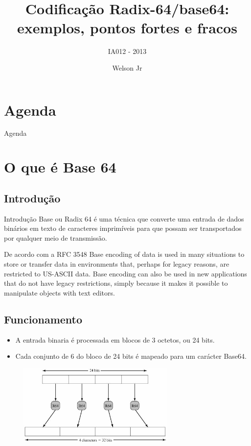\documentclass[pdf]{beamer}
\author{Welson Jr}
\title{Codificação Radix-64/base64: exemplos, pontos fortes e fracos}
\subtitle{IA012 - 2013}
\begin{document}
\begin{frame}
\transdissolve
\maketitle
\end{frame}
\section{Agenda}
\begin{frame}{Agenda}
\transdissolve
	\tableofcontents
\end{frame}


\section{O que é Base 64}
\subsection{Introdução}
\begin{frame}{Introdução}
\transdissolve
Base ou Radix 64 é uma técnica que converte uma entrada de dados binários em texto de caracteres imprimíveis para que possam ser transportados por qualquer meio de transmissão.
\pause
\begin{block}{De acordo com a RFC 3548}
Base encoding of data is used in many situations to store or transfer data in environments that, perhaps for legacy reasons, are restricted to US-ASCII data.  Base encoding can also be used in new applications that do not have legacy restrictions, simply because it makes it possible to manipulate objects with text editors.
\end{block}
\end{frame}
\subsection{Funcionamento}
\begin{frame}
\transdissolve
\begin{itemize}
\item A entrada binaria é processada em blocos de 3 octetos, ou 24 bits.
\item Cada conjunto de 6 do bloco de 24 bits é mapeado para um carácter Base64.
\end{itemize}
\begin{figure}[ht]
\begin{center}
\includegraphics[height=4cm]{15fig11.jpg}
\end{center}
\end{figure}
\end{frame}
\end{document}
